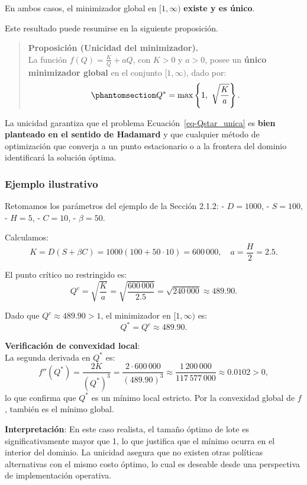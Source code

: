 \documentclass[
  spanish,
  us-letterpaper,
  DIV=11,
  numbers=noendperiod]{scrreprt}
\numberwithin{equation}{section}
\begin{document}
En ambos casos, el minimizador global en \([1, \infty)\) \textbf{existe
y es único}.

Este resultado puede resumirse en la siguiente proposición.

\begin{quote}
\textbf{Proposición (Unicidad del minimizador).}\\
La función \(f(Q) = \frac{K}{Q} + a Q\), con \(K > 0\) y \(a > 0\),
posee un \textbf{único minimizador global} en el conjunto
\([1, \infty)\), dado por:
\begin{equation}\phantomsection\label{eq-Qstar_unica}{
Q^* = \max\left\{ 1,\ \sqrt{\frac{K}{a}} \right\}.
}\end{equation}
\end{quote}

La unicidad garantiza que el problema Ecuación~\ref{eq-Qstar_unica} es
\textbf{bien planteado en el sentido de Hadamard} y que cualquier método
de optimización que converja a un punto estacionario o a la frontera del
dominio identificará la solución óptima.

\subsubsection{Ejemplo ilustrativo}\label{ejemplo-ilustrativo-2}

Retomamos los parámetros del ejemplo de la Sección 2.1.2: -
\(D = 1000\), - \(S = 100\), - \(H = 5\), - \(C = 10\), -
\(\beta = 50\).

Calculamos: \[
K = D(S + \beta C) = 1000(100 + 50 \cdot 10) = 600\,000,
\quad
a = \frac{H}{2} = 2.5.
\]

El punto crítico no restringido es: \[
Q^c = \sqrt{\frac{K}{a}} = \sqrt{\frac{600\,000}{2.5}} = \sqrt{240\,000} \approx 489.90.
\]

Dado que \(Q^c \approx 489.90 > 1\), el minimizador en \([1, \infty)\)
es: \[
Q^* = Q^c \approx 489.90.
\]

\textbf{Verificación de convexidad local}:\\
La segunda derivada en \(Q^*\) es: \[
f''(Q^*) = \frac{2K}{(Q^*)^3} = \frac{2 \cdot 600\,000}{(489.90)^3} \approx \frac{1\,200\,000}{117\,577\,000} \approx 0.0102 > 0,
\] lo que confirma que \(Q^*\) es un mínimo local estricto. Por la
convexidad global de \(f\), también es el mínimo global.

\textbf{Interpretación}: En este caso realista, el tamaño óptimo de lote
es significativamente mayor que 1, lo que justifica que el mínimo ocurra
en el interior del dominio. La unicidad asegura que no existen otras
políticas alternativas con el mismo costo óptimo, lo cual es deseable
desde una perspectiva de implementación operativa.
\end{document}

